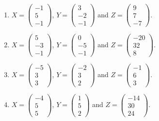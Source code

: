 \begin{enumerate}[label=\arabic*.,  leftmargin=*]
\item $X = \begin{pmatrix} -1 \\ 5 \\ -1 \end{pmatrix}$, $Y = \begin{pmatrix} 3 \\ -2 \\ -1 \end{pmatrix}$ and $Z = \begin{pmatrix} 9 \\ 7 \\ -7 \end{pmatrix}$.
\item $X = \begin{pmatrix} 5 \\ -3 \\ -1 \end{pmatrix}$, $Y = \begin{pmatrix} 0 \\ -5 \\ -1 \end{pmatrix}$ and $Z = \begin{pmatrix} -20 \\ 32 \\ 8 \end{pmatrix}$.
\item $X = \begin{pmatrix} -5 \\ 3 \\ 3 \end{pmatrix}$, $Y = \begin{pmatrix} -2 \\ 3 \\ 2 \end{pmatrix}$ and $Z = \begin{pmatrix} -1 \\ 6 \\ 3 \end{pmatrix}$.
\item $X = \begin{pmatrix} -4 \\ 5 \\ 5 \end{pmatrix}$, $Y = \begin{pmatrix} 1 \\ 5 \\ 2 \end{pmatrix}$ and $Z = \begin{pmatrix} -14 \\ 30 \\ 24 \end{pmatrix}$.

\end{enumerate}

